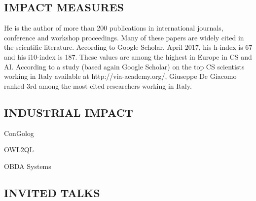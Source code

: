 \subsection*{IMPACT MEASURES}
He is the author of more than 200 publications in international journals, conference and workshop proceedings. Many of these papers are widely cited in the scientific literature. According to Google Scholar, April 2017, his h-index is 67 and his i10-index is 187. These values are among the highest in Europe in CS and AI. According to a study (based again Google Scholar) on the top CS scientists working in Italy available at http://via-academy.org/, Giuseppe De Giacomo ranked 3rd among the most cited researchers working in Italy. 


\subsection*{INDUSTRIAL IMPACT}

ConGolog

OWL2QL

OBDA Systems


\subsection*{INVITED TALKS}

